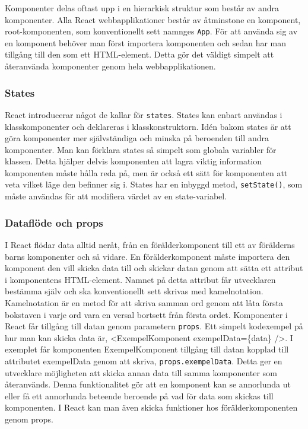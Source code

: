Komponenter delas oftast upp i en hierarkisk struktur som består av andra komponenter. Alla React webbapplikationer består av åtminstone en komponent, root-komponenten, som konventionellt sett namnges \texttt{App}. För att använda sig av en komponent behöver man först importera komponenten och sedan har man tillgång till den som ett HTML-element. Detta gör det väldigt simpelt att återanvända komponenter genom hela webbapplikationen.



\subsubsection{States}
\label{axel:react-states} 
React introducerar något de kallar för \texttt{states}.\cite{react-states} States kan enbart användas i klasskomponenter och deklareras i klasskonstruktorn. Idén bakom states är att göra komponenter mer självständiga och minska på beroenden till andra komponenter. Man kan förklara states så simpelt som globala variabler för klassen. Detta hjälper delvis komponenten att lagra viktig information komponenten måste hålla reda på, men är också ett sätt för komponenten att veta vilket läge den befinner sig i. States har en inbyggd metod, \texttt{setState()}, som måste användas för att modifiera värdet av en state-variabel. 

\subsubsection{Dataflöde och props}
I React flödar data alltid neråt\cite{react-states}, från en förälderkomponent till ett av förälderns barns komponenter och så vidare. En förälderkomponent måste importera den komponent den vill skicka data till och skickar datan genom att sätta ett attribut i komponentens HTML-element. Namnet på detta attribut får utvecklaren bestämma själv och ska konventionellt sett skrivas med kamelnotation. Kamelnotation är en metod för att skriva samman ord genom att låta första bokstaven i varje ord vara en versal bortsett från första ordet. Komponenter i React får tillgång till datan genom parametern \texttt{props}. Ett simpelt kodexempel på hur man kan skicka data är, <ExempelKomponent exempelData=\{data\} />. I exemplet får komponenten ExempelKomponent tillgång till datan kopplad till attributet exempelData genom att skriva, \texttt{props.exempelData}. Detta ger en utvecklare möjligheten att skicka annan data till samma komponenter som återanvänds. Denna funktionalitet gör att en komponent kan se annorlunda ut eller få ett annorlunda beteende beroende på vad för data som skickas till komponenten. I React kan man även skicka funktioner hos förälderkomponenten genom props. 
